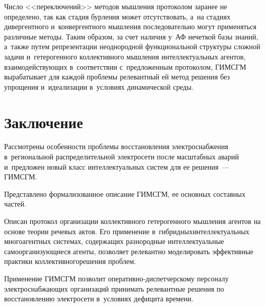 \begin{multicols}{2}
  Число <<переключений>> методов мышления протоколом заранее не 
определено, так как стадия бурления может отсутствовать, а~на стадиях 
дивергентного и~конвергентного мыш\-ле\-ния последовательно могут 
применяться различные методы. Таким образом, за счет наличия у~АФ 
нечеткой базы знаний, а~также путем репрезентации неоднородной 
функциональной структуры сложной задачи и~гетерогенного коллективного 
мышления интеллектуальных агентов, взаимодействующих в~соответствии 
с~предложенным протоколом, \mbox{ГИМСГМ} вырабатывает для каждой проб\-ле\-мы 
релевантный ей метод решения без упрощения и~идеализации в~условиях 
динамической среды. 

\section{Заключение}

  Рассмотрены особенности проблемы вос\-ста\-нов\-ле\-ния электроснабжения 
в~региональной распределительной электросети после масштабных аварий 
и~предложен новый класс интеллектуальных сис\-тем для ее решения~--- 
\mbox{ГИМСГМ}. 

Представлено
 формализованное описание \mbox{ГИМСГМ}, ее основных 
составных частей. 

Описан протокол организации коллективного гетерогенного 
мышления агентов на основе теории речевых актов. Его применение 
в~гиб\-рид\-ных\linebreak интеллектуальных многоагентных системах, содержащих 
разнородные интеллектуальные самоорганизующиеся агенты, позволяет 
релевантно моделировать эффективные практики коллективного\linebreak решения 
проблем. 

Применение \mbox{ГИМСГМ} позволит  
опе\-ра\-тив\-но-дис\-пет\-чер\-ско\-му персоналу электроснабжающих 
организаций принимать релевантные решения по восстановлению электросети 
в~условиях дефицита времени.
  

\end{multicols}
